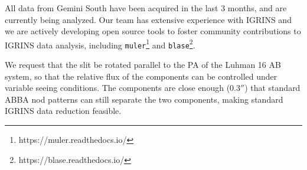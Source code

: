\documentclass[11pt]{article}
\begin{document}
{All data from Gemini South have been acquired in the last 3 months, and are currently being analyzed.  
Our team has extensive experience with IGRINS and we are actively developing open source tools to foster community contributions to IGRINS data analysis, including \texttt{muler}\footnote{https://muler.readthedocs.io/} and \texttt{blase}\footnote{https://blase.readthedocs.io/}.


%

\technicaldescription


We request that the slit be rotated parallel to the PA of the Luhman 16 AB system, so that the relative flux of the components can be controlled under variable seeing conditions.  The components are close enough ($0.3''$) that standard ABBA nod patterns can still separate the two components, making standard IGRINS data reduction feasible.



}
\end{document}

